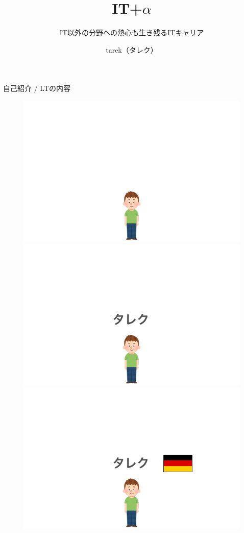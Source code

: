 \documentclass[lualatex,aspectratio=169]{beamer}
\title{IT+$\alpha$}
\subtitle{IT以外の分野への熱心も生き残るITキャリア}
\author{tarek（タレク）}
\institute{株式会社Helpfeel}
\date{}
\begin{document}
\begin{frame}[plain]
  \titlepage
\end{frame}



\begin{frame}[t]{自己紹介 / LTの内容}
    \begin{figure}
        \begin{overprint}
            \begin{center}\includegraphics[width=0.8\linewidth]{./img/intro_0.pdf}\end{center}
            \begin{center}\includegraphics[width=0.8\linewidth]{./img/intro_1.pdf}\end{center}
            \begin{center}\includegraphics[width=0.8\linewidth]{./img/intro_1-1.pdf}\end{center}

\end{overprint}
\end{figure}
\end{frame}
\end{document}
